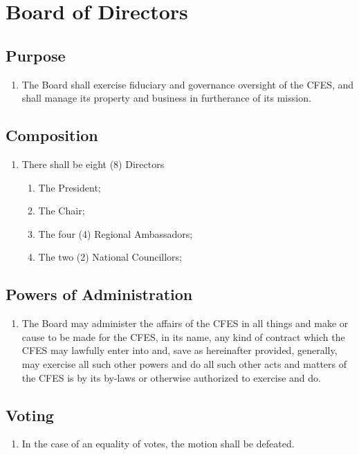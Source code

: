 \section{Board of Directors}
\label{board-of-directors}

\subsection{Purpose}
\label{board-of-directors-purpose}

\begin{enumerate}
 \item The Board shall exercise fiduciary and governance oversight of the CFES, and shall manage its property and business in furtherance of its mission.
\end{enumerate}

\subsection{Composition}
\label{board-of-directors-composition}

\begin{enumerate}
 \item There shall be eight (8) Directors
  \begin{enumerate}
   \item The President;
   \item The Chair;
   \item The four (4) Regional Ambassadors;
   \item The two (2) National Councillors;
  \end{enumerate}
\end{enumerate}

\subsection{Powers of Administration}
\label{board-of-directors-powers-of-administration}

\begin{enumerate}
 \item The Board may administer the affairs of the CFES in all things and make or cause to be made for the CFES, in its name, any kind of contract which the CFES may lawfully enter into and, save as hereinafter provided, generally, may exercise all such other powers and do all such other acts and matters of the CFES is by its by-laws or otherwise authorized to exercise and do.
\end{enumerate}

\subsection{Voting}
\label{board-of-directors-voting}

\begin{enumerate}
 \item In the case of an equality of votes, the motion shall be defeated.
\end{enumerate}
